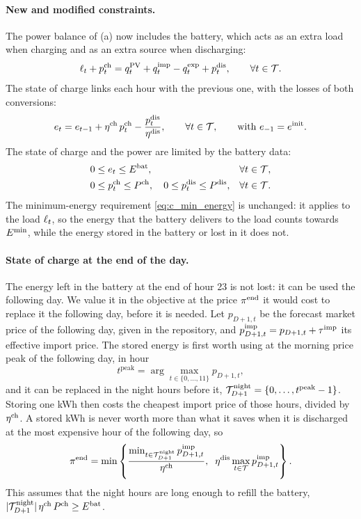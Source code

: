 \paragraph{New and modified constraints.}
The power balance of (a) now includes the battery, which acts as an extra load when charging
and as an extra source when discharging:
\begin{equation}
    \load + \pch = \pvprod + \qimp - \qexp + \pdis, \qquad \forall t \in \T.
    \label{eq:g_balance}
\end{equation}
The state of charge links each hour with the previous one, with the losses of both
conversions:
\begin{equation}
    \soc = \soc[t-1] + \etach \, \pch - \frac{\pdis}{\etadis}, \qquad \forall t \in \T,
    \qquad \text{with } \soc[-1] = \einit.
    \label{eq:g_soc}
\end{equation}
The state of charge and the power are limited by the battery data:
\begin{align}
    & 0 \leq \soc \leq \Ebat, & \forall t \in \T, \label{eq:g_cap} \\
    & 0 \leq \pch \leq \Pch, \quad 0 \leq \pdis \leq \Pdis, & \forall t \in \T. \label{eq:g_power}
\end{align}
The minimum-energy requirement \eqref{eq:c_min_energy} is unchanged: it applies to the load
$\load$, so the energy that the battery delivers to the load counts towards $\Emin$, while
the energy stored in the battery or lost in it does not.

\paragraph{State of charge at the end of the day.}
The energy left in the battery at the end of hour 23 is not lost: it can be used the following
day. We value it in the objective at the price $\piend$ it would cost to replace it the
following day, before it is needed. Let $p_{D+1,t}$ be the forecast market price of the
following day, given in the repository, and $p^{\mathrm{imp}}_{D+1,t} = p_{D+1,t} + \tauimp$
its effective import price. The stored energy is first worth using at the morning price peak
of the following day, in hour
\begin{equation}
    t^{\mathrm{peak}} = \arg\max_{t \in \{0, \dots, 11\}} p_{D+1,t},
\end{equation}
and it can be replaced in the night hours before it,
$\T^{\mathrm{night}}_{D+1} = \{0, \dots, t^{\mathrm{peak}} - 1\}$. Storing one kWh then costs
the cheapest import price of those hours, divided by $\etach$. A stored kWh is never worth
more than what it saves when it is discharged at the most expensive hour of the following day,
so
\begin{equation}
    \piend = \min \left\{
        \frac{\min_{t \in \T^{\mathrm{night}}_{D+1}} p^{\mathrm{imp}}_{D+1,t}}{\etach},
        \;\; \etadis \max_{t \in \T} p^{\mathrm{imp}}_{D+1,t}
    \right\}.
    \label{eq:g_piend}
\end{equation}
This assumes that the night hours are long enough to refill the battery,
$|\T^{\mathrm{night}}_{D+1}| \, \etach \, \Pch \geq \Ebat$.

